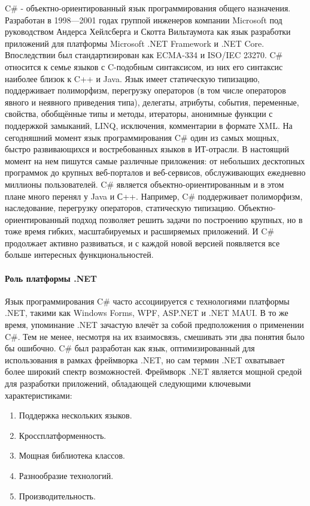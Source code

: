 C\# - объектно-ориентированный язык программирования общего назначения. Разработан в 1998—2001 годах группой инженеров компании Microsoft под руководством Андерса Хейлсберга и Скотта Вильтаумота как язык разработки приложений для платформы Microsoft .NET Framework и .NET Core. Впоследствии был стандартизирован как ECMA-334 и ISO/IEC 23270.
C\# относится к семье языков с C-подобным синтаксисом, из них его синтаксис наиболее близок к C++ и Java. Язык имеет статическую типизацию, поддерживает полиморфизм, перегрузку операторов (в том числе операторов явного и неявного приведения типа), делегаты, атрибуты, события, переменные, свойства, обобщённые типы и методы, итераторы, анонимные функции с поддержкой замыканий, LINQ, исключения, комментарии в формате XML.
На сегодняшний момент язык программирования C\# один из самых мощных, быстро развивающихся и востребованных языков в ИТ-отрасли. В настоящий момент на нем пишутся самые различные приложения: от небольших десктопных программок до крупных веб-порталов и веб-сервисов, обслуживающих ежедневно миллионы пользователей.
C\# является объектно-ориентированным и в этом плане много перенял у Java и С++. Например, C\# поддерживает полиморфизм, наследование, перегрузку операторов, статическую типизацию. Объектно-ориентированный подход позволяет решить задачи по построению крупных, но в тоже время гибких, масштабируемых и расширяемых приложений. И C\# продолжает активно развиваться, и с каждой новой версией появляется все больше интересных функциональностей.

\paragraph{Роль платформы .NET}

Язык программирования C\# часто ассоциируется с технологиями платформы .NET, такими как Windows Forms, WPF, ASP.NET и .NET MAUI. В то же время, упоминание .NET зачастую влечёт за собой предположения о применении C\#. Тем не менее, несмотря на их взаимосвязь, смешивать эти два понятия было бы ошибочно. C\# был разработан как язык, оптимизированный для использования в рамках фреймворка .NET, но сам термин .NET охватывает более широкий спектр возможностей.
Фреймворк .NET является мощной средой для разработки приложений, обладающей следующими ключевыми характеристиками:
\begin{enumerate}
	\item Поддержка нескольких языков.
	\item Кроссплатформенность.
	\item Мощная библиотека классов.
	\item Разнообразие технологий.
	\item Производительность.
\end{enumerate}

